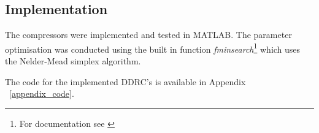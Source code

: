 \documentclass[../main2.tex]{subfiles}
\begin{document}
\subsection{Implementation} \label{method_implementation}
The compressors were implemented and tested in MATLAB\textsuperscript{\textregistered}. The parameter optimisation was conducted using the built in function \emph{fminsearch}\footnote{For documentation see \cite{fminsearch}} which uses the Nelder-Mead simplex algorithm. 

The code for the implemented DDRC's is available in Appendix ~\ref{appendix_code}.
%
%
%
\end{document}
